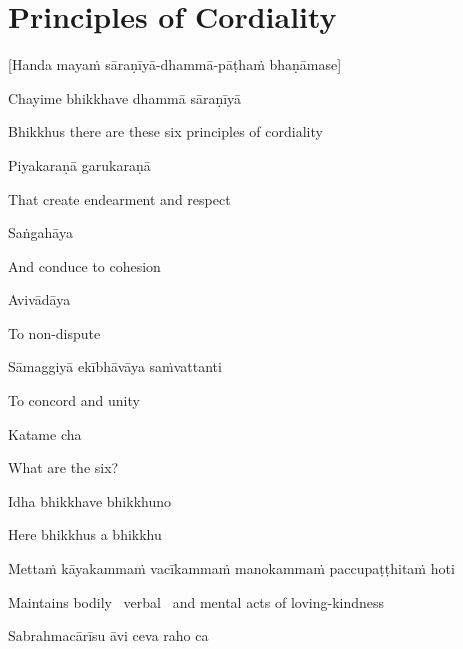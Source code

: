 \section{Principles of Cordiality}
\label{principles-of-cordiality}

\begin{center}
  [Handa mayaṁ sāraṇīyā-dhammā-pāṭhaṁ bhaṇāmase]
\end{center}

Chayime bhikkhave dhammā sāraṇīyā

\begin{cprenglish}
  Bhikkhus there are these six principles of cordiality
\end{cprenglish}

Piyakaraṇā garukaraṇā

\begin{cprenglish}
  That create endearment and respect
\end{cprenglish}

Saṅgahāya

\begin{cprenglish}
  And conduce to cohesion
\end{cprenglish}

Avivādāya

\begin{cprenglish}
  To non-dispute
\end{cprenglish}

Sāmaggiyā ekībhāvāya saṁvattanti

\begin{cprenglish}
  To concord and unity
\end{cprenglish}

Katame cha

\begin{cprenglish}
  What are the six?
\end{cprenglish}

Idha bhikkhave bhikkhuno

\begin{cprenglish}
  Here bhikkhus a bhikkhu
\end{cprenglish}

Mettaṁ kāyakammaṁ vacīkammaṁ manokammaṁ paccupaṭṭhitaṁ hoti

\begin{cprenglish}
  Maintains bodily \breathmark\ verbal \breathmark\ and mental acts of loving-kindness
\end{cprenglish}

Sabrahmacārīsu āvi ceva raho ca

